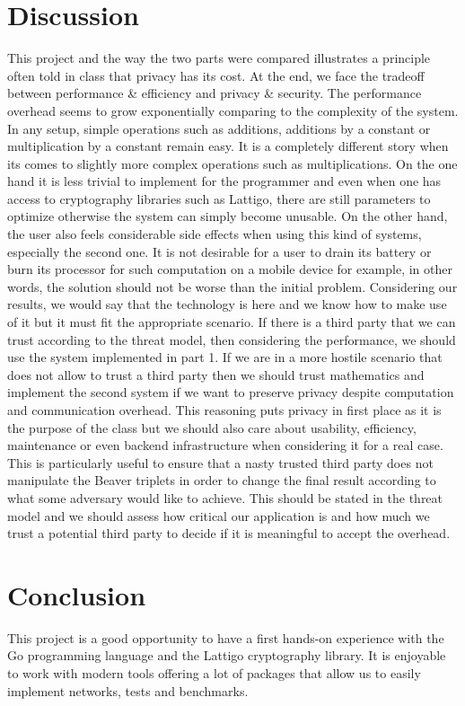 \documentclass[10pt,conference]{IEEEtran}
\begin{document}
\section{Discussion}
This project and the way the two parts were compared illustrates a principle often told in class that privacy has its cost. At the end, we face the tradeoff between performance \& efficiency and privacy \& security. The performance overhead seems to grow exponentially comparing to the complexity of the system. In any setup, simple operations such as additions, additions by a constant or multiplication by a constant remain easy. It is a completely different story when its comes to slightly more complex operations such as multiplications. On the one hand it is less trivial to implement for the programmer and even when one has access to cryptography libraries such as Lattigo, there are still parameters to optimize otherwise the system can simply become unusable. On the other hand, the user also feels considerable side effects when using this kind of systems, especially the second one. It is not desirable for a user to drain its battery or burn its processor for such computation on a mobile device for example, in other words, the solution should not be worse than the initial problem. Considering our results, we would say that the technology is here and we know how to make use of it but it must fit the appropriate scenario. If there is a third party that we can trust according to the threat model, then considering the performance, we should use the system implemented in part 1. If we are in a more hostile scenario that does not allow to trust a third party then we should trust mathematics and implement the second system if we want to preserve privacy despite computation and communication overhead. This reasoning puts privacy in first place as it is the purpose of the class but we should also care about usability, efficiency, maintenance or even backend infrastructure when considering it for a real case. This is particularly useful to ensure that a nasty trusted third party does not manipulate the Beaver triplets in order to change the final result according to what some adversary would like to achieve. This should be stated in the threat model and we should assess how critical our application is and how much we trust a potential third party to decide if it is meaningful to accept the overhead.

\section{Conclusion}
This project is a good opportunity to have a first hands-on experience with the Go programming language and the Lattigo cryptography library. It is enjoyable to work with modern tools offering a lot of packages that allow us to easily implement networks, tests and benchmarks.
\end{document}
